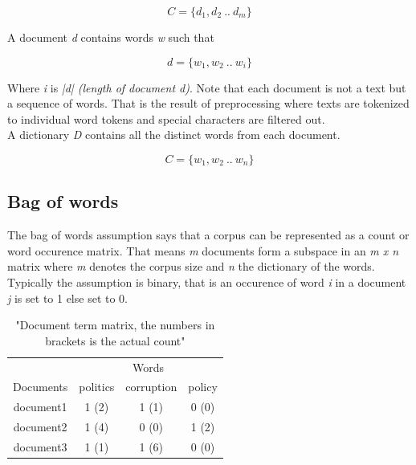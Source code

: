     \begin{equation}
      C = \{d_1, d_2 \: .. \: d_m\}
    \end{equation}

    A document \emph{d} contains words \emph{w} such that
    
    \begin{equation}
      d = \{w_1, w_2 \: .. \: w_i\}
    \end{equation}
    
    Where \emph{i} is \emph{|d| (length of document d)}. Note that each document is not a text but a sequence of words. That is the result of preprocessing where texts are tokenized to individual word tokens and special characters are filtered out.\\
    A dictionary \emph{D} contains all the distinct words from each document.

    \begin{equation}
      C = \{w_1, w_2 \: .. \: w_n\}
    \end{equation}

  \subsection{Bag of words}
    The bag of words assumption says that a corpus can be represented as a count or word occurence matrix. That means \emph{m} documents form a subspace in an \emph{m x n} matrix where \emph{m} denotes the corpus size and \emph{n} the dictionary of the words. Typically the assumption is binary, that is an occurence of word \emph{i} in a document \emph{j} is set to 1 else set to 0.

    \begin{table}[h!]
      \centering
      \begin{tabular}{c|c|c|c}
        \multicolumn{1}{r|}{} & \multicolumn{3}{c}{Words} \\
        \cline{1-4}
        Documents &   politics &   corruption &  policy  \\
        \hline
        document1 &    1 (2)   &     1 (1)    &   0 (0)  \\
        document2 &    1 (4)   &     0 (0)    &   1 (2)  \\
        document3 &    1 (1)   &     1 (6)    &   0 (0)  \\
      \end{tabular}\\
      \caption{"Document term matrix, the numbers in brackets is the actual count"}
    \end{table}

